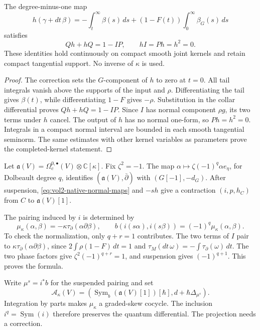 \begin{lemma}\label{lem:vol2-native-normal}
The degree-minus-one map
\[
 h(\gamma+dt\,\beta)=-\int_t^\infty\beta(s)\,ds
                  +(1-F(t))\int_0^\infty\beta_G(s)\,ds
\]
satisfies
\[
 Qh+hQ=1-IP,
 \qquad hI=Ph=h^2=0.
\]
These identities hold continuously on compact smooth joint kernels and
retain compact tangential support. No inverse of \(\kappa\) is used.
\end{lemma}

\begin{proof}
The correction sets the \(G\)-component of \(h\) to zero at \(t=0\).
All tail integrals vanish above the supports of the input and \(\rho\).
Differentiating the tail gives \(\beta(t)\), while differentiating
\(1-F\) gives \(-\rho\). Substitution in the collar differential proves
\(Qh+hQ=1-IP\). Since \(I\) has normal component \(\rho g\), its two
terms under \(h\) cancel. The output of \(h\) has no normal one-form,
so \(Ph=h^2=0\). Integrals in a compact normal interval are bounded in
each smooth tangential seminorm. The same estimates with other kernel
variables as parameters prove the completed-kernel statement.
\end{proof}

Let \(\mathfrak a(V)=\Omega_c^{0,\bullet}(V)\otimes\mathbb C[\kappa]\).
Fix \(\zeta^2=-1\). The map
\(\alpha\mapsto\zeta(-1)^q\alpha e_\eta\), for Dolbeault degree \(q\),
identifies \((\mathfrak a(V),\bar\partial)\) with \((G[-1],-d_G)\).
After suspension, \eqref{eq:vol2-native-normal-maps} and \(-sh\) give
a contraction \((i,p,h_C)\) from \(C\) to \(\mathfrak a(V)[1]\).

The pairing induced by \(i\) is determined by
\begin{equation}\label{eq:vol2-native-current-cocycle}
 \mu_\kappa(\alpha,\beta)
       =-\kappa\tau_\partial(\alpha\partial\beta),
 \qquad
 b(i(s\alpha),i(s\beta))=(-1)^q\mu_\kappa(\alpha,\beta).
\end{equation}
To check the normalization, only \(q+r=1\) contributes. The two terms
of \(I\) pair to
\(\kappa\tau_\partial(\alpha\partial\beta)\), since
\(2\int\rho(1-F)\,dt=1\) and
\(\tau_M(dt\,\omega)=-\int\tau_\partial(\omega)\,dt\).
The two phase factors give \(\zeta^2(-1)^{q+r}=1\), and suspension
gives \((-1)^{q+1}\). This proves the formula.

Write \(\mu^s=i^*b\) for the suspended pairing and set
\[
 \mathcal A_\kappa(V)=
 \left(\operatorname{Sym}_b(\mathfrak a(V)[1])[\hbar],
                  d+\hbar\Delta_{\mu^s}\right).
\]
Integration by parts makes \(\mu_\kappa\) a graded-skew cocycle.
The inclusion \(i^q=\operatorname{Sym}(i)\) therefore preserves the quantum
differential. The projection needs a correction.

